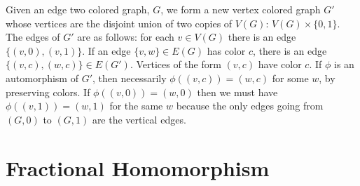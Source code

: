 \documentclass{article}
\begin{document}
Given an edge two colored graph, $G$, we form a new vertex colored
graph $G'$ whose vertices are the disjoint union of two copies of
$V(G)$: $V(G) \times \{0,1\}$.  The edges of $G'$ are as follows:
for each $v \in V(G)$ there is an edge $\{(v,0), (v,1)\}$.  If an edge
$\{v,w\} \in E(G)$ has color $c$, there is an edge $\{(v,c), (w,c)\}
\in E(G')$.  Vertices of the form $(v,c)$ have color $c$.  If $\phi$
is an automorphism of $G'$, then necessarily $\phi((v,c)) = (w,c)$ for
some $w$, by preserving colors.  If $\phi((v,0)) = (w,0)$ then we must
have $\phi((v,1)) = (w,1)$ for the same $w$ because the only edges
going from $(G,0)$ to $(G,1)$ are the vertical edges.

\section{Fractional Homomorphism}
\label{sec:fractional}
\end{document}
